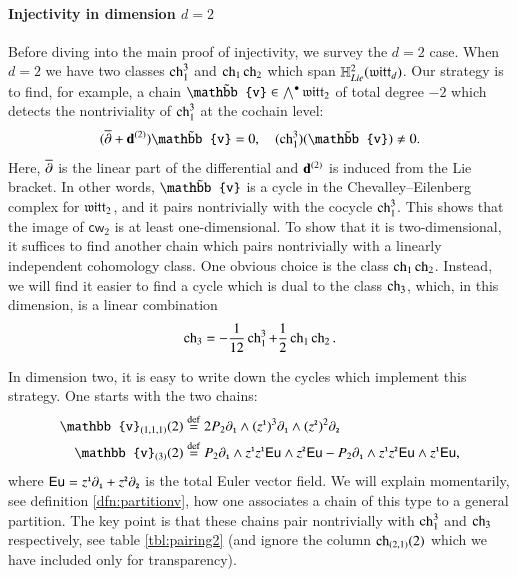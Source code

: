 \documentclass[main.tex]{subfiles}
\begin{document}
\paragraph{Injectivity in dimension $d=2$}
Before diving into the main proof of injectivity, we survey the $d=2$ case. 
When $d=2$ we have two classes $\operatorname{ch}_1^3$ and $\operatorname{ch}_1 \operatorname{ch}_2$ which span $\mathbb H^2_{Lie}(\mathfrak{witt}_d)$.
Our strategy is to find, for example, a chain $\til{\mathbb{v}}\in \bigwedge^{\bullet}\lie{witt}_{2}$ of total degree $-2$
which detects the nontriviality of $\operatorname{ch}_1^3$ at the
cochain level:
$$
(\dbar + \bd^{(2)})\til{\mathbb{v}}=0,\quad (\mathrm{ch}_1^3)(\til{\mathbb{v}})\neq 0.
$$
Here, $\overline{\partial}$ is the linear part of the differential and $\mathbf d^{(2)}$ is induced from the Lie bracket.
In other words, $\til{\mathbb{v}}$ is a cycle in the Chevalley--Eilenberg complex for $\mathfrak{witt}_2$, and it pairs
nontrivially with the cocycle $\operatorname{ch}_1^3$.
This shows that the image of $\mathsf{cw}_2$ is at least one-dimensional.
To show that it is two-dimensional, it suffices to find another chain which pairs nontrivially with a linearly
independent cohomology class.
One obvious choice is the class $\operatorname{ch}_1 \operatorname{ch}_2$.
Instead, we will find it easier to find a cycle which is dual to the class $\operatorname{ch}_3$, which, in this dimension, is a linear combination 
\begin{equation}\label{}
  \operatorname{ch}_3 = -\frac{1}{12} \operatorname{ch}_1^3 + \frac12  \operatorname{ch}_1 \operatorname{ch}_2 .
\end{equation}


In dimension two, it is easy to write down the cycles which implement this strategy.
One starts with the two chains:
\begin{align*}
  \mathbb{v}_{(1,1,1)}(2) & \define  2 P_2\partial_{\1}\wedge (z^{\1})^3\partial_{\1}\wedge (z^{\2})^2\partial_{\2} \\
  \mathbb{v}_{(3)}(2) & \define P_2\partial_{\1}\wedge z^{\1}z^{\1}\mathsf{Eu}\wedge z^{\2} \mathsf{Eu}
  -P_2\partial_{\1} \wedge z^{\1}z^{\2} \mathsf{Eu}\wedge z^{\1} \mathsf{Eu},
\end{align*}
where $\mathsf{Eu} = z^{\textbf{\texttt{\tiny{1}}}} \partial_{{\textbf{\texttt{\tiny{1}}}}} + z^{\textbf{\texttt{\tiny{2}}}} \partial_{\textbf{\texttt{\tiny{2}}}}$ is the total Euler vector field.
We will explain momentarily, see definition \ref{dfn:partitionv}, how one associates a chain of this type to a general
partition.
The key point is that these chains pair nontrivially with $\operatorname{ch}_1^3$ and $\operatorname{ch}_3$ respectively, see table
\ref{tbl:pairing2} (and ignore the column $\operatorname{ch}_{(2,1)}(2)$ which we have included only for transparency).
\end{document}
